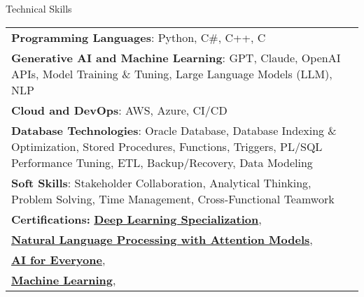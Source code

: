 \documentclass{resume} %
\begin{document}
    \begin{rSection}{Technical Skills}
        \begin{tabular}{ @{} l @{\hspace{1ex}} l }
                                \textbf{Programming Languages}: Python, C\#, C++, C\\
                                \textbf{Generative AI and Machine Learning}: GPT, Claude, OpenAI APIs, Model Training \& Tuning, Large Language Models (LLM), NLP\\
                                \textbf{Cloud and DevOps}: AWS, Azure, CI/CD\\
                                \textbf{Database Technologies}: Oracle Database, Database Indexing \& Optimization, Stored Procedures, Functions, Triggers, PL/SQL Performance Tuning, ETL, Backup/Recovery, Data Modeling\\
                                \textbf{Soft Skills}: Stakeholder Collaboration, Analytical Thinking, Problem Solving, Time Management, Cross{-}Functional Teamwork\\
                        \textbf{Certifications:} 
                                            \href{https://www.coursera.org/account/accomplishments/specialization/G3WPNWRYX628}{\textbf{Deep Learning Specialization}},\\
                                            \href{https://www.coursera.org/account/accomplishments/verify/ABC123XYZ}{\textbf{Natural Language Processing with Attention Models}},\\
                                            \href{https://www.coursera.org/account/accomplishments/verify/DEF456UVW}{\textbf{AI for Everyone}},\\
                                            \href{https://www.coursera.org/account/accomplishments/verify/GHI789RST}{\textbf{Machine Learning}},\\
                                 
        \end{tabular}
    \end{rSection}
 
\end{document}
